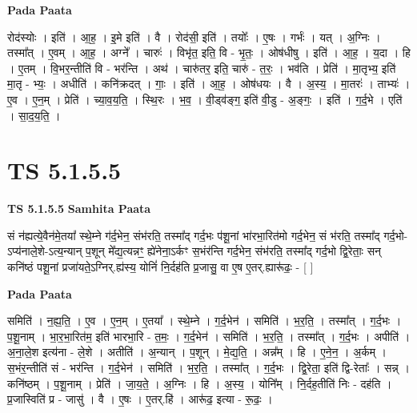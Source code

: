 \documentclass[17pt]{extarticle}
\begin{document}
\textbf{Pada Paata} \newline

रोद॑स्योः । इति॑ । आ॒ह॒ । इ॒मे इति॑ । वै । रोद॑सी॒ इति॑ । तयोः᳚ । ए॒षः । गर्भः॑ । यत् । अ॒ग्निः । तस्मा᳚त् । ए॒वम् । आ॒ह॒ । अग्ने᳚ । चारुः॑ । विभृ॑त॒ इति॒ वि - भृ॒तः॒ । ओष॑धीषु । इति॑ । आ॒ह॒ । य॒दा । हि । ए॒तम् । वि॒भर॒न्तीति॑ वि - भर॑न्ति । अथ॑ । चारु॑तर॒ इति॒ चारु॑ - त॒रः॒ । भव॑ति । प्रेति॑ । मा॒तृभ्य॒ इति॑ मा॒तृ - भ्यः॒ । अधीति॑ । कनि॑क्रदत् । गाः॒ । इति॑ । आ॒ह॒ । ओष॑धयः । वै । अ॒स्य॒ । मा॒तरः॑ । ताभ्यः॑ । ए॒व । ए॒न॒म् । प्रेति॑ । च्या॒व॒य॒ति॒ । स्थि॒रः । भ॒व॒ । वी॒ड्व॑ङ्ग॒ इति॑ वी॒डु - अ॒ङ्गः॒ । इति॑ । ग॒र्द॒भे । एति॑ । सा॒द॒य॒ति॒ ।  \newline





\section{ TS 5.1.5.5 }

\textbf{TS 5.1.5.5 } \newline
\textbf{Samhita Paata} \newline

सं न॑ह्यत्ये॒वैन॑मे॒तया᳚ स्थे॒म्ने ग॑र्द॒भेन॒ संभ॑रति॒ तस्मा᳚द् गर्द॒भः प॑शू॒नां भा॑रभा॒रित॑मो गर्द॒भेन॒ सं भ॑रति॒ तस्मा᳚द् गर्द॒भो-ऽप्य॑नाले॒शे-ऽत्य॒न्यान् प॒शून् मे᳚द्य॒त्यन्नꣳ॒॒ ह्ये॑नेना॒ऽर्कꣳ स॒भंर॑न्ति गर्द॒भेन॒ संभ॑रति॒ तस्मा᳚द् गर्द॒भो द्वि॒रेताः॒ सन् कनि॑ष्ठं पशू॒नां प्रजा॑यते॒ऽग्निर्.ह्य॑स्य॒ योनिं॑ नि॒र्दह॑ति प्र॒जासु॒ वा ए॒ष ए॒तर्.ह्यारू॑ढः॒ - [  ] \newline

\textbf{Pada Paata} \newline

समिति॑ । न॒ह्य॒ति॒ । ए॒व । ए॒न॒म् । ए॒तया᳚ । स्थे॒म्ने । ग॒र्द॒भेन॑ । समिति॑ । भ॒र॒ति॒ । तस्मा᳚त् । ग॒र्द॒भः । प॒शू॒नाम् । भा॒र॒भा॒रित॑म॒ इति॑ भारभा॒रि - त॒मः॒ । ग॒र्द॒भेन॑ । समिति॑ । भ॒र॒ति॒ । तस्मा᳚त् । ग॒र्द॒भः । अपीति॑ । अ॒ना॒ले॒श इत्य॑ना - ले॒शे । अतीति॑ । अ॒न्यान् । प॒शून् । मे॒द्य॒ति॒ । अन्न᳚म् । हि । ए॒ने॒न॒ । अ॒र्कम् । स॒भंर॒न्तीति॑ सं - भर॑न्ति । ग॒र्द॒भेन॑ । समिति॑ । भ॒र॒ति॒ । तस्मा᳚त् । ग॒र्द॒भः । द्वि॒रेता॒ इति॑ द्वि-रेताः᳚ । सन्न् । कनि॑ष्ठम् । प॒शू॒नाम् । प्रेति॑ । जा॒य॒ते॒ । अ॒ग्निः । हि । अ॒स्य॒ । योनि᳚म् । नि॒र्दह॒तीति॑ निः - दह॑ति । प्र॒जास्विति॑ प्र - जासु॑ । वै । ए॒षः । ए॒तर्.हि॑ । आरू॑ढ॒ इत्या - रू॒ढः॒ ।  \newline
\end{document}
